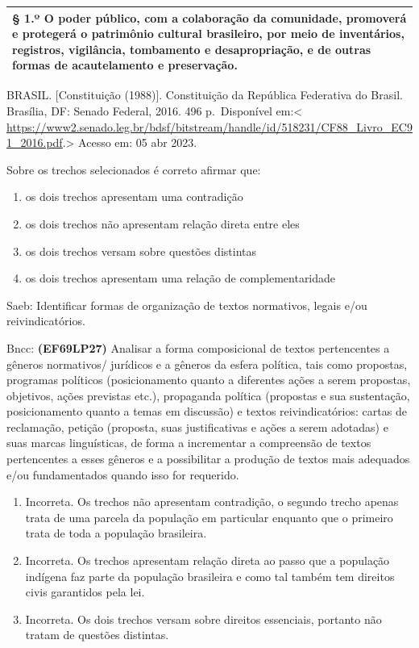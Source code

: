 {\begin{longtable}[]{@{}
  >{\raggedright\arraybackslash}p{}@{}}
§ 1.º O poder público, com a colaboração da comunidade, promoverá e
protegerá o patrimônio cultural brasileiro, por meio de inventários,
registros, vigilância, tombamento e desapropriação, e de outras formas
de acautelamento e preservação. \\
\bottomrule
\end{longtable}

BRASIL. {[}Constituição (1988){]}. Constituição da República Federativa
do Brasil. Brasília, DF: Senado Federal, 2016. 496 p.~Disponível
em:\textless{}
\href{https://www2.senado.leg.br/bdsf/bitstream/handle/id/518231/CF88_Livro_EC91_2016.pdf}{\uline{https://www2.senado.leg.br/bdsf/bitstream/handle/id/518231/CF88\_Livro\_EC91\_2016.pdf}}.\textgreater{}
Acesso em: 05 abr 2023.

Sobre os trechos selecionados é correto afirmar que:

\begin{enumerate}
\def\labelenumi{\alph{enumi})}
\item
  os dois trechos apresentam uma contradição
\item
  os dois trechos não apresentam relação direta entre eles
\item
  os dois trechos versam sobre questões distintas
\item
  os dois trechos apresentam uma relação de complementaridade
\end{enumerate}

Saeb: Identificar formas de organização de textos normativos, legais
e/ou reivindicatórios.

Bncc: \textbf{(EF69LP27)} Analisar a forma composicional de textos
pertencentes a gêneros normativos/ jurídicos e a gêneros da esfera
política, tais como propostas, programas políticos (posicionamento
quanto a diferentes ações a serem propostas, objetivos, ações previstas
etc.), propaganda política (propostas e sua sustentação, posicionamento
quanto a temas em discussão) e textos reivindicatórios: cartas de
reclamação, petição (proposta, suas justificativas e ações a serem
adotadas) e suas marcas linguísticas, de forma a incrementar a
compreensão de textos pertencentes a esses gêneros e a possibilitar a
produção de textos mais adequados e/ou fundamentados quando isso for
requerido.

\begin{enumerate}
\def\labelenumi{\arabic{enumi}.}
\item
  Incorreta. Os trechos não apresentam contradição, o segundo trecho
  apenas trata de uma parcela da população em particular enquanto que o
  primeiro trata de toda a população brasileira.
\item
  Incorreta. Os trechos apresentam relação direta ao passo que a
  população indígena faz parte da população brasileira e como tal também
  tem direitos civis garantidos pela lei.
\item
  Incorreta. Os dois trechos versam sobre direitos essenciais, portanto
  não tratam de questões distintas.
\end{enumerate}

}
